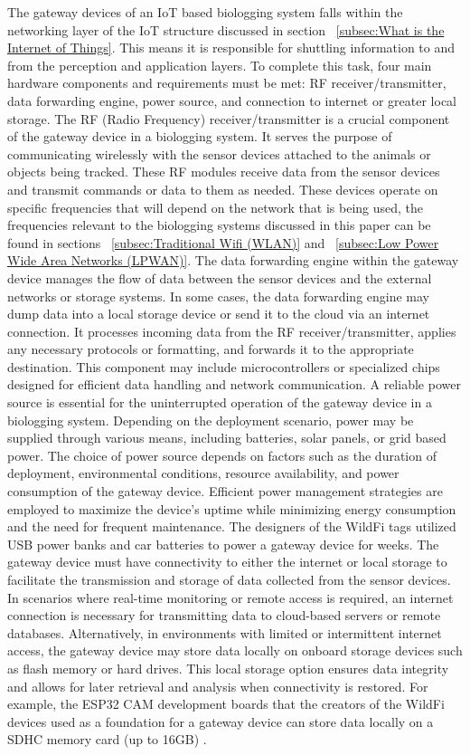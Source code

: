 \documentclass[sigplan,screen,nonacm]{acmart}
\begin{document}
The gateway devices of an IoT based biologging system falls within the networking layer of the IoT 
structure discussed in section ~\ref{subsec:What is the Internet of Things}. This means it is responsible 
for shuttling information to and from the perception and application layers. To complete this task, four main 
hardware components and requirements must be met: RF receiver/transmitter, data forwarding engine, power source, 
and connection to internet or greater local storage.
The RF (Radio Frequency) receiver/transmitter is a crucial component of the gateway device in a biologging system. 
It serves the purpose of communicating wirelessly with the sensor devices attached to the animals or objects being 
tracked. These RF modules receive data from the sensor devices and transmit commands or data to them as needed. 
These devices operate on specific frequencies that will depend on the network that is being used, the frequencies 
relevant to the biologging systems discussed in this paper can be found in sections ~\ref{subsec:Traditional Wifi 
(WLAN)} and ~\ref{subsec:Low Power Wide Area Networks (LPWAN)}.
The data forwarding engine within the gateway device manages the flow of data between the sensor devices and 
the external networks or storage systems. In some cases, the data forwarding engine may dump data into a local storage 
device or send it to the cloud via an internet connection. It processes incoming data from the RF receiver/transmitter, 
applies any necessary protocols or formatting, and forwards it to the appropriate destination. This component may include 
microcontrollers or specialized chips designed for efficient data handling and network communication.
A reliable power source is essential for the uninterrupted operation of the gateway device in a biologging system. 
Depending on the deployment scenario, power may be supplied through various means, including batteries, solar panels, 
or grid based power. The choice of power source depends on factors such as the duration of deployment, 
environmental conditions, resource availability, and power consumption of the gateway device. Efficient power management 
strategies are employed to maximize the device's uptime while minimizing energy consumption and the need for frequent 
maintenance. The designers of the WildFi tags utilized USB power banks and car batteries to power a gateway device for 
weeks\cite{wild2023internet}. 
The gateway device must have connectivity to either the internet or local storage to facilitate the transmission and 
storage of data collected from the sensor devices. In scenarios where real-time monitoring or remote access is required, 
an internet connection is necessary for transmitting data to cloud-based servers or remote databases. Alternatively, in 
environments with limited or intermittent internet access, the gateway device may store data locally on onboard storage 
devices such as flash memory or hard drives. This local storage option ensures data integrity and allows for later 
retrieval and analysis when connectivity is restored. For example, the ESP32 CAM development boards that the creators 
of the WildFi devices used as a foundation for a gateway device can store data locally on a SDHC memory card (up to 16GB) 
\cite{wild2023internet}.
\end{document}
